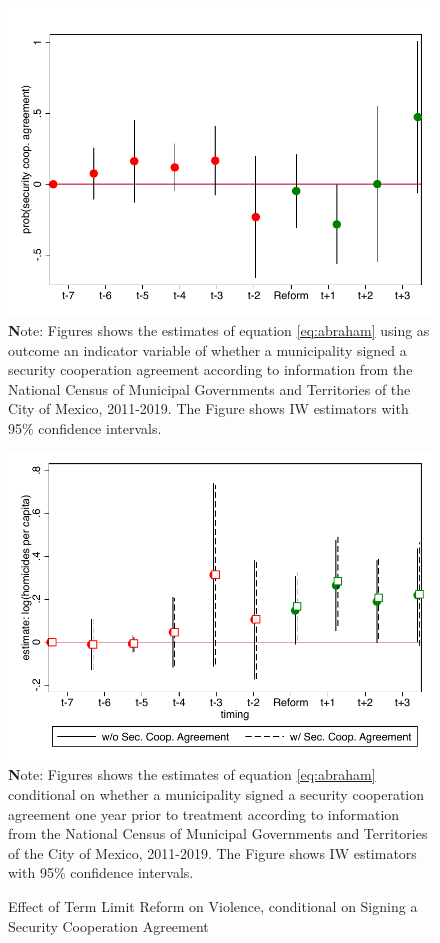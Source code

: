 \documentclass[12pt]{amsart}
\numberwithin{equation}{section}
\theoremstyle{definition}
\theoremstyle{definition}
\theoremstyle{definition}
\begin{document}
\begin{appendix}
\begin{figure}[H]
 \includegraphics[width=1\textwidth]{Figures/mando_unico.pdf}
       \captionsetup{justification=centering}
 {\textbf Note: Figures shows the estimates of equation \ref{eq:abraham} using as outcome an indicator variable of whether a municipality signed a security cooperation agreement according to information from the National Census of Municipal Governments and Territories of the City of Mexico, 2011-2019. The Figure shows IW estimators with 95\% confidence intervals.} 
 
\end{figure}  

 \begin{figure}[H]
\centering
\caption{Effect of Term Limit Reform on Violence, conditional on Signing a Security Cooperation Agreement}
  \label{fig:controlling_mando_unico}

 \includegraphics[width=1\textwidth]{Figures/controlling_mando_unico_log.pdf}
       \captionsetup{justification=centering}
 {\textbf Note: Figures shows the estimates of equation \ref{eq:abraham} conditional on whether a municipality signed a security cooperation agreement one year prior to treatment according to information from the National Census of Municipal Governments and Territories of the City of Mexico, 2011-2019. The Figure shows IW estimators with 95\% confidence intervals.}    
   

\end{figure}
\end{appendix}
\end{document}
